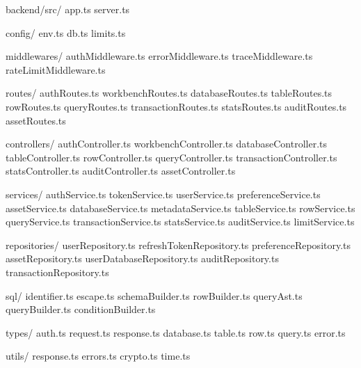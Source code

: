 \documentclass[
  a4paper,
  UTF8]{ctexart}
\newenvironment{Shaded}{}{}
\newcommand{\NormalTok}[1]{#1}
\begin{document}
\begin{Shaded}
\begin{Highlighting}[]
\NormalTok{backend/src/}
\NormalTok{  app.ts}
\NormalTok{  server.ts}

\NormalTok{  config/}
\NormalTok{    env.ts}
\NormalTok{    db.ts}
\NormalTok{    limits.ts}

\NormalTok{  middlewares/}
\NormalTok{    authMiddleware.ts}
\NormalTok{    errorMiddleware.ts}
\NormalTok{    traceMiddleware.ts}
\NormalTok{    rateLimitMiddleware.ts}

\NormalTok{  routes/}
\NormalTok{    authRoutes.ts}
\NormalTok{    workbenchRoutes.ts}
\NormalTok{    databaseRoutes.ts}
\NormalTok{    tableRoutes.ts}
\NormalTok{    rowRoutes.ts}
\NormalTok{    queryRoutes.ts}
\NormalTok{    transactionRoutes.ts}
\NormalTok{    statsRoutes.ts}
\NormalTok{    auditRoutes.ts}
\NormalTok{    assetRoutes.ts}

\NormalTok{  controllers/}
\NormalTok{    authController.ts}
\NormalTok{    workbenchController.ts}
\NormalTok{    databaseController.ts}
\NormalTok{    tableController.ts}
\NormalTok{    rowController.ts}
\NormalTok{    queryController.ts}
\NormalTok{    transactionController.ts}
\NormalTok{    statsController.ts}
\NormalTok{    auditController.ts}
\NormalTok{    assetController.ts}

\NormalTok{  services/}
\NormalTok{    authService.ts}
\NormalTok{    tokenService.ts}
\NormalTok{    userService.ts}
\NormalTok{    preferenceService.ts}
\NormalTok{    assetService.ts}
\NormalTok{    databaseService.ts}
\NormalTok{    metadataService.ts}
\NormalTok{    tableService.ts}
\NormalTok{    rowService.ts}
\NormalTok{    queryService.ts}
\NormalTok{    transactionService.ts}
\NormalTok{    statsService.ts}
\NormalTok{    auditService.ts}
\NormalTok{    limitService.ts}

\NormalTok{  repositories/}
\NormalTok{    userRepository.ts}
\NormalTok{    refreshTokenRepository.ts}
\NormalTok{    preferenceRepository.ts}
\NormalTok{    assetRepository.ts}
\NormalTok{    userDatabaseRepository.ts}
\NormalTok{    auditRepository.ts}
\NormalTok{    transactionRepository.ts}

\NormalTok{  sql/}
\NormalTok{    identifier.ts}
\NormalTok{    escape.ts}
\NormalTok{    schemaBuilder.ts}
\NormalTok{    rowBuilder.ts}
\NormalTok{    queryAst.ts}
\NormalTok{    queryBuilder.ts}
\NormalTok{    conditionBuilder.ts}

\NormalTok{  types/}
\NormalTok{    auth.ts}
\NormalTok{    request.ts}
\NormalTok{    response.ts}
\NormalTok{    database.ts}
\NormalTok{    table.ts}
\NormalTok{    row.ts}
\NormalTok{    query.ts}
\NormalTok{    error.ts}

\NormalTok{  utils/}
\NormalTok{    response.ts}
\NormalTok{    errors.ts}
\NormalTok{    crypto.ts}
\NormalTok{    time.ts}
\end{Highlighting}
\end{Shaded}
\end{document}
